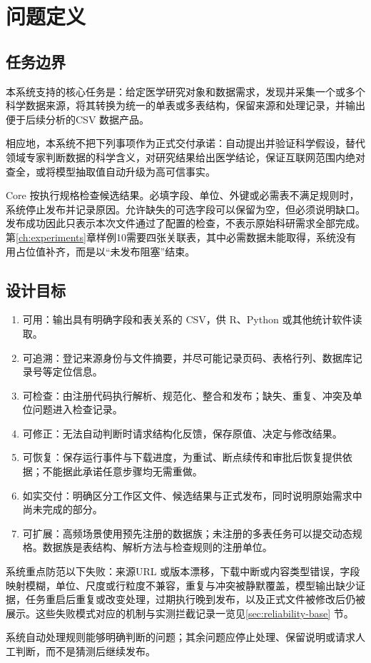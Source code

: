 \chapter{问题定义}\label{ch:problem-definition}

\section{任务边界}

本系统支持的核心任务是：给定医学研究对象和数据需求，发现并采集一个或多个科学数据来源，将其转换为统一的单表或多表结构，保留来源和处理记录，并输出便于后续分析的CSV 数据产品。

相应地，本系统不把下列事项作为正式交付承诺：自动提出并验证科学假设，替代领域专家判断数据的科学含义，对研究结果给出医学结论，保证互联网范围内绝对查全，或将模型抽取值自动升级为高可信事实。

Core 按执行规格检查候选结果。必填字段、单位、外键或必需表不满足规则时，系统停止发布并记录原因。允许缺失的可选字段可以保留为空，但必须说明缺口。发布成功因此只表示本次文件通过了配置的检查，不表示原始科研需求全部完成。第\ref{ch:experiments}章样例10需要四张关联表，其中必需数据未能取得，系统没有用占位值补齐，而是以“未发布阻塞”结束。

\section{设计目标}\label{sec:design-goals}

\begin{enumerate}
  \item 可用：输出具有明确字段和表关系的 CSV，供 R、Python 或其他统计软件读取。
  \item 可追溯：登记来源身份与文件摘要，并尽可能记录页码、表格行列、数据库记录号等定位信息。
  \item 可检查：由注册代码执行解析、规范化、整合和发布；缺失、重复、冲突及单位问题进入检查记录。
  \item 可修正：无法自动判断时请求结构化反馈，保存原值、决定与修改结果。
  \item 可恢复：保存运行事件与下载进度，为重试、断点续传和审批后恢复提供依据；不能据此承诺任意步骤均无需重做。
  \item 如实交付：明确区分工作区文件、候选结果与正式发布，同时说明原始需求中尚未完成的部分。
  \item 可扩展：高频场景使用预先注册的数据族；未注册的多表任务可以提交动态规格。数据族是表结构、解析方法与检查规则的注册单位。
\end{enumerate}

系统重点防范以下失败：来源URL 或版本漂移，下载中断或内容类型错误，字段映射模糊，单位、尺度或行粒度不兼容，重复与冲突被静默覆盖，模型输出缺少证据，任务重启后重复或改变处理，过期执行晚到发布，以及正式文件被修改后仍被展示。这些失败模式对应的机制与实测拦截记录一览见\ref{sec:reliability-base} 节。

系统自动处理规则能够明确判断的问题；其余问题应停止处理、保留说明或请求人工判断，而不是猜测后继续发布。

